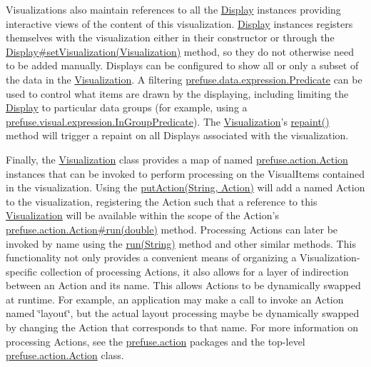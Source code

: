 \-Visualizations also maintain references to all the \hyperlink{classprefuse_1_1_display}{\-Display} instances providing interactive views of the content of this visualization. \hyperlink{classprefuse_1_1_display}{\-Display} instances registers themselves with the visualization either in their constructor or through the \hyperlink{classprefuse_1_1_display_adbe30cf6361872089b006128c5769609}{\-Display\#set\-Visualization(\-Visualization)} method, so they do not otherwise need to be added manually. \-Displays can be configured to show all or only a subset of the data in the \hyperlink{classprefuse_1_1_visualization}{\-Visualization}. \-A filtering \hyperlink{}{prefuse.\-data.\-expression.\-Predicate} can be used to control what items are drawn by the displaying, including limiting the \hyperlink{classprefuse_1_1_display}{\-Display} to particular data groups (for example, using a \hyperlink{}{prefuse.\-visual.\-expression.\-In\-Group\-Predicate}). \-The \hyperlink{classprefuse_1_1_visualization}{\-Visualization}'s \hyperlink{classprefuse_1_1_visualization_a77146c0f22cfd4bd6bace12fc0a0b3db}{repaint()} method will trigger a repaint on all \-Displays associated with the visualization.

\-Finally, the \hyperlink{classprefuse_1_1_visualization}{\-Visualization} class provides a map of named \hyperlink{}{prefuse.\-action.\-Action} instances that can be invoked to perform processing on the \-Visual\-Items contained in the visualization. \-Using the \hyperlink{classprefuse_1_1_visualization_ab88ff623061fbf6688332aeb52c58188}{put\-Action(\-String, Action)} will add a named \-Action to the visualization, registering the \-Action such that a reference to this \hyperlink{classprefuse_1_1_visualization}{\-Visualization} will be available within the scope of the \-Action's \hyperlink{}{prefuse.\-action.\-Action\#run(double)} method. \-Processing \-Actions can later be invoked by name using the \hyperlink{classprefuse_1_1_visualization_a4facaabe0cced10a0e87c04e811ca125}{run(\-String)} method and other similar methods. \-This functionality not only provides a convenient means of organizing a \-Visualization-\/specific collection of processing \-Actions, it also allows for a layer of indirection between an \-Action and its name. \-This allows \-Actions to be dynamically swapped at runtime. \-For example, an application may make a call to invoke an \-Action named \char`\"{}layout\char`\"{}, but the actual layout processing maybe be dynamically swapped by changing the \-Action that corresponds to that name. \-For more information on processing \-Actions, see the \hyperlink{}{prefuse.\-action} packages and the top-\/level \hyperlink{}{prefuse.\-action.\-Action} class.

